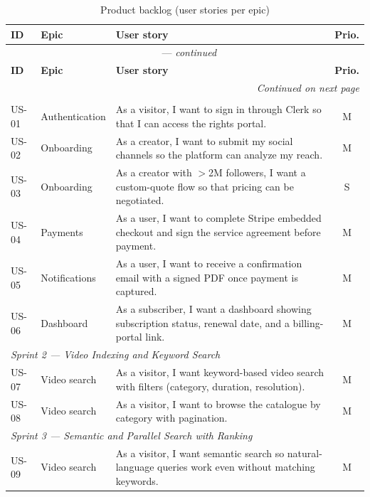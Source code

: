 \small
\begin{longtable}{@{}llp{}c@{}}
\caption{Product backlog (user stories per epic)}
\label{tab:product_backlog} \\
\toprule
\textbf{ID} & \textbf{Epic} & \textbf{User story} & \textbf{Prio.} \\
\midrule
\endfirsthead
\multicolumn{4}{c}{\tablename~\thetable{} — \textit{continued}} \\
\toprule
\textbf{ID} & \textbf{Epic} & \textbf{User story} & \textbf{Prio.} \\
\midrule
\endhead
\midrule
\multicolumn{4}{r}{\textit{Continued on next page}} \\
\endfoot
\bottomrule
\endlastfoot
\multicolumn{4}{l}{\textit{Sprint 1 — Authentication, Onboarding and Payments}} \\
\midrule
US-01 & Authentication  & As a visitor, I want to sign in through Clerk so that I can access
  the rights portal. & M \\
US-02 & Onboarding      & As a creator, I want to submit my social channels so the platform can
  analyze my reach. & M \\
US-03 & Onboarding      & As a creator with $>$2M followers, I want a custom-quote flow so that
  pricing can be negotiated. & S \\
US-04 & Payments        & As a user, I want to complete Stripe embedded checkout and sign the
  service agreement before payment. & M \\
US-05 & Notifications   & As a user, I want to receive a confirmation email with a signed PDF
  once payment is captured. & M \\
US-06 & Dashboard       & As a subscriber, I want a dashboard showing subscription status,
  renewal date, and a billing-portal link. & M \\
\midrule
\multicolumn{4}{l}{\textit{Sprint 2 — Video Indexing and Keyword Search}} \\
\midrule
US-07 & Video search    & As a visitor, I want keyword-based video search with filters
  (category, duration, resolution). & M \\
US-08 & Video search    & As a visitor, I want to browse the catalogue by category with
  pagination. & M \\
\midrule
\multicolumn{4}{l}{\textit{Sprint 3 — Semantic and Parallel Search with Ranking}} \\
\midrule
US-09 & Video search    & As a visitor, I want semantic search so natural-language queries work
  even without matching keywords. & M \\

\end{longtable}
